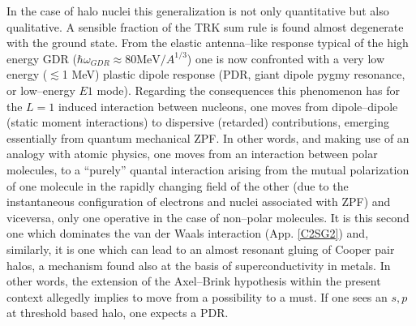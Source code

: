 In the case of halo nuclei this generalization is not only quantitative but also qualitative. A sensible fraction of the TRK sum rule is found almost degenerate with the ground state. From the elastic antenna--like response typical of the high energy GDR ($\hbar\omega_{GDR}\approx80\text{MeV}/A^{1/3}$)  one is now confronted with a very low energy ($\lesssim$1 MeV) plastic dipole response (PDR, giant dipole pygmy resonance, or low--energy $E1$ mode). Regarding the consequences this phenomenon has for the $L=1$ induced interaction between nucleons, one moves from dipole--dipole (static moment interactions) to dispersive (retarded) contributions, emerging essentially from quantum mechanical ZPF. In other words, and making use of an analogy with atomic physics, one moves from an interaction between polar molecules, to a ``purely'' quantal interaction arising from the mutual polarization of one molecule in the rapidly changing field of the other (due to the instantaneous configuration of electrons and nuclei associated with ZPF) and viceversa, only one operative in the case of non--polar molecules. It is this second one which dominates the van der Waals interaction (App. \ref{C2SG2}) and, similarly, it is one which can lead to an almost resonant gluing of Cooper pair halos, a mechanism found also at the basis of superconductivity in metals. In other words, the extension of the Axel--Brink hypothesis  within the present context allegedly implies to move from a possibility to a must. If one sees an $s,p$ at threshold based halo, one expects a PDR.


